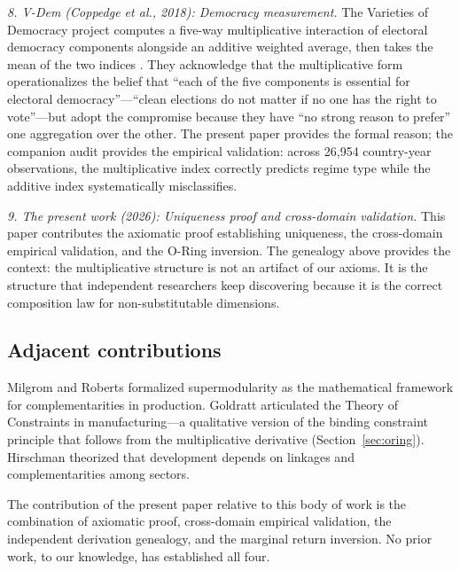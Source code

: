 \documentclass[12pt, a4paper]{article}
\theoremstyle{definition}
\theoremstyle{remark}
\begin{document}
\textit{8. V-Dem (Coppedge et al., 2018): Democracy measurement.} The Varieties of Democracy project computes a five-way multiplicative interaction of electoral democracy components alongside an additive weighted average, then takes the mean of the two indices \cite{coppedge2018}. They acknowledge that the multiplicative form operationalizes the belief that ``each of the five components is essential for electoral democracy''---``clean elections do not matter if no one has the right to vote''---but adopt the compromise because they have ``no strong reason to prefer'' one aggregation over the other. The present paper provides the formal reason; the companion audit \cite{kirsch2026audit} provides the empirical validation: across 26,954 country-year observations, the multiplicative index correctly predicts regime type while the additive index systematically misclassifies.

\textit{9. The present work (2026): Uniqueness proof and cross-domain validation.} This paper contributes the axiomatic proof establishing uniqueness, the cross-domain empirical validation, and the O-Ring inversion. The genealogy above provides the context: the multiplicative structure is not an artifact of our axioms. It is the structure that independent researchers keep discovering because it is the correct composition law for non-substitutable dimensions.

\subsection{Adjacent contributions}

Milgrom and Roberts \cite{milgrom1990} formalized supermodularity as the mathematical framework for complementarities in production. Goldratt \cite{goldratt1984} articulated the Theory of Constraints in manufacturing---a qualitative version of the binding constraint principle that follows from the multiplicative derivative (Section~\ref{sec:oring}). Hirschman \cite{hirschman1958} theorized that development depends on linkages and complementarities among sectors.

The contribution of the present paper relative to this body of work is the combination of axiomatic proof, cross-domain empirical validation, the independent derivation genealogy, and the marginal return inversion. No prior work, to our knowledge, has established all four.


\end{document}
